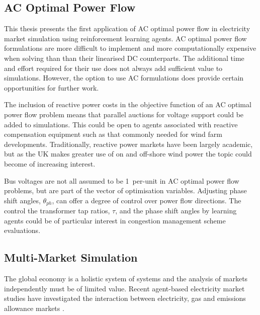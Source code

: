 
\subsection{AC Optimal Power Flow}
This thesis presents the first application of AC optimal power flow in
electricity market simulation using reinforcement learning agents.  AC optimal
power flow formulations are more difficult to implement and more computationally
expensive when solving than than their linearised DC counterparts.  The
additional time and effort required for their use does not always add sufficient
value to simulations.  However, the option to use AC formulations does
provide certain opportunities for further work.

The inclusion of reactive power costs in the objective function of an AC
optimal power flow problem means that parallel auctions for voltage support
could be added to simulations.  This could be open to agents associated with
reactive compensation equipment such as that commonly needed for wind farm
developments.  Traditionally, reactive power markets have been largely
academic, but as the UK makes greater use of on and off-shore wind power the
topic could become of increasing interest.

Bus voltages are not all assumed to be 1~per-unit in AC optimal power flow
problems, but are part of the vector of optimisation variables.  Adjusting
phase shift angles, $\theta_{ph}$, can offer a degree of control over
power flow directions.  The control the transformer tap ratios, $\tau$, and
the phase shift angles by learning agents could be of particular interest in
congestion management scheme evaluations.

\subsection{Multi-Market Simulation}
The global economy is a holistic system of
systems and the analysis of markets independently must be of limited value.
Recent agent-based electricity market studies have investigated the
interaction between electricity, gas and emissions allowance markets
\cite{krause:gas,wang:09}.

